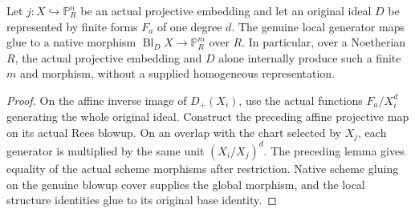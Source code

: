 \begin{theorem}
\label{thm:blowup-projective-global-map}
\leanok
{}
Let $j:X\hookrightarrow\mathbb P^n_R$ be an actual projective embedding and
let an original ideal $D$ be represented by finite forms $F_a$ of one degree
$d$. The genuine local generator maps glue to a native morphism
$\operatorname{Bl}_D X\to\mathbb P^m_R$ over $R$.
In particular, over a Noetherian $R$, the actual projective embedding and
$D$ alone internally produce such a finite $m$ and morphism, without a
supplied homogeneous representation.
\end{theorem}
\begin{proof}
On the affine inverse image of $D_+(X_i)$, use the actual functions
$F_a/X_i^d$ generating the whole original ideal. Construct the preceding
affine projective map on its actual Rees blowup. On an overlap with the
chart selected by $X_j$, each generator is multiplied by the same unit
$(X_i/X_j)^d$. The preceding lemma gives equality of the actual scheme
morphisms after restriction. Native scheme gluing on the genuine blowup
cover supplies the global morphism, and the local structure identities
glue to its original base identity.
\end{proof}

\endgroup

\begingroup

